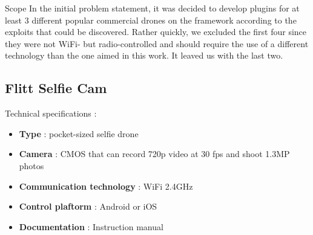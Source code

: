 \begin{chaptercover}{Scope}
In the initial problem statement, it was decided to develop plugins for at least 3 different popular commercial drones on the framework according to the exploits that could be discovered. Rather quickly, we excluded the first four since they were not WiFi- but radio-controlled and should require the use of a different technology than the one aimed in this work. It leaved us with the last two.

\subsection{Flitt Selfie Cam}\label{subsec:flitt-selfie-cam}

Technical specifications :
\begin{itemize}[itemsep=.1cm,topsep=.1cm]
  \item \textbf{Type} : pocket-sized selfie drone
  \item \textbf{Camera} : CMOS that can record 720p video at 30 fps and shoot 1.3MP photos
  \item \textbf{Communication technology} : WiFi 2.4GHz
  \item \textbf{Control plaftorm} : Android or iOS
  \item \textbf{Documentation} : Instruction manual \cite{flitt-selfie-cam}
\end{itemize}


\end{chaptercover}
